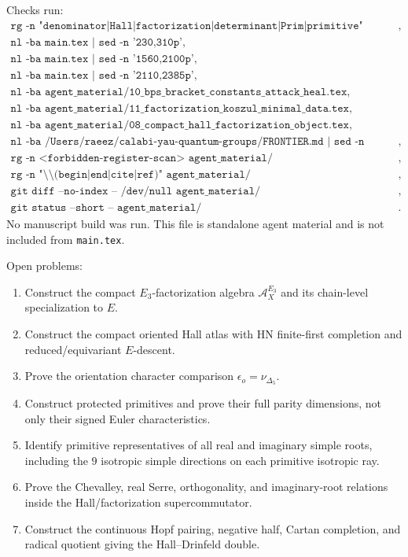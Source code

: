 Checks run:
\[
\begin{array}{l}
\texttt{rg -n "denominator|Hall|factorization|determinant|Prim|primitive" main.tex},\\
\texttt{nl -ba main.tex | sed -n '230,310p'},\\
\texttt{nl -ba main.tex | sed -n '1560,2100p'},\\
\texttt{nl -ba main.tex | sed -n '2110,2385p'},\\
\texttt{nl -ba agent\_material/10\_bps\_bracket\_constants\_attack\_heal.tex},\\
\texttt{nl -ba agent\_material/11\_factorization\_koszul\_minimal\_data.tex},\\
\texttt{nl -ba agent\_material/08\_compact\_hall\_factorization\_object.tex},\\
\texttt{nl -ba /Users/raeez/calabi-yau-quantum-groups/FRONTIER.md | sed -n '1,260p'},\\
\texttt{rg -n <forbidden-register-scan> agent\_material/12\_primitive\_comparison\_attack\_heal.tex},\\
\texttt{rg -n "\textbackslash\textbackslash(begin|end|cite|ref)" agent\_material/12\_primitive\_comparison\_attack\_heal.tex},\\
\texttt{git diff --no-index -- /dev/null agent\_material/12\_primitive\_comparison\_attack\_heal.tex},\\
\texttt{git status --short -- agent\_material/12\_primitive\_comparison\_attack\_heal.tex}.
\end{array}
\]
No manuscript build was run.  This file is standalone agent material and
is not included from \texttt{main.tex}.

Open problems:
\begin{enumerate}
\item Construct the compact \(E_3\)-factorization algebra
\(\mathcal A_X^{E_3}\) and its chain-level specialization to \(E\).
\item Construct the compact oriented Hall atlas with HN finite-first
completion and reduced/equivariant \(E\)-descent.
\item Prove the orientation character comparison
\(\epsilon_o=\nu_{\Delta_5}\).
\item Construct protected primitives and prove their full parity
dimensions, not only their signed Euler characteristics.
\item Identify primitive representatives of all real and imaginary
simple roots, including the \(9\) isotropic simple directions on each
primitive isotropic ray.
\item Prove the Chevalley, real Serre, orthogonality, and imaginary-root
relations inside the Hall/factorization supercommutator.
\item Construct the continuous Hopf pairing, negative half, Cartan
completion, and radical quotient giving the Hall--Drinfeld double.
\end{enumerate}
